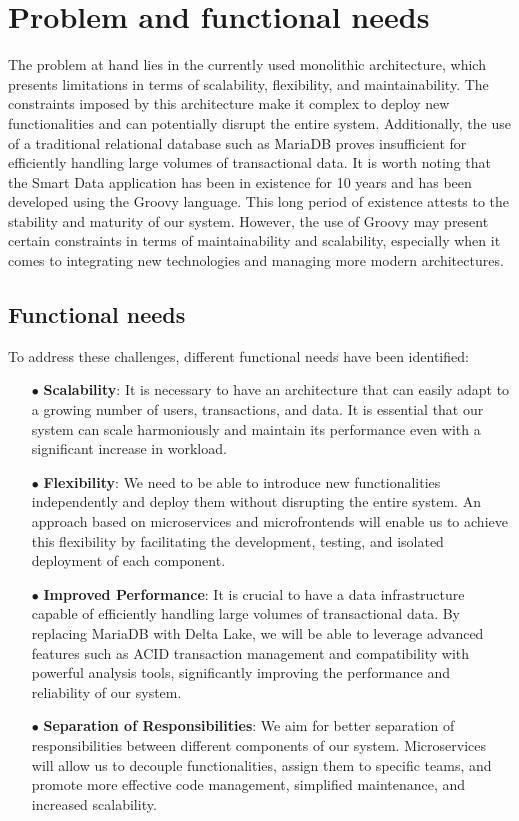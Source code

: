 \section{Problem and functional needs}

The problem at hand lies in the currently used monolithic architecture, which presents limitations in terms of scalability, flexibility, and maintainability. The constraints imposed by this architecture make it complex to deploy new functionalities and can potentially disrupt the entire system. Additionally, the use of a traditional relational database such as MariaDB proves insufficient for efficiently handling large volumes of transactional data. It is worth noting that the Smart Data application has been in existence for 10 years and has been developed using the Groovy language. This long period of existence attests to the stability and maturity of our system. However, the use of Groovy may present certain constraints in terms of maintainability and scalability, especially when it comes to integrating new technologies and managing more modern architectures.

\subsection*{Functional needs}

To address these challenges, different functional needs have been identified:

\begin{enumerate}
\item[$\bullet$] \textbf{Scalability}: It is necessary to have an architecture that can easily adapt to a growing number of users, transactions, and data. It is essential that our system can scale harmoniously and maintain its performance even with a significant increase in workload.
\item[$\bullet$] \textbf{Flexibility}: We need to be able to introduce new functionalities independently and deploy them without disrupting the entire system. An approach based on microservices and microfrontends will enable us to achieve this flexibility by facilitating the development, testing, and isolated deployment of each component.
\item[$\bullet$] \textbf{Improved Performance}: It is crucial to have a data infrastructure capable of efficiently handling large volumes of transactional data. By replacing MariaDB with Delta Lake, we will be able to leverage advanced features such as ACID transaction management and compatibility with powerful analysis tools, significantly improving the performance and reliability of our system.
\item[$\bullet$] \textbf{Separation of Responsibilities}: We aim for better separation of responsibilities between different components of our system. Microservices will allow us to decouple functionalities, assign them to specific teams, and promote more effective code management, simplified maintenance, and increased scalability.
\end{enumerate}


